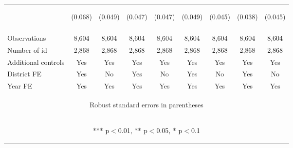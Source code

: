 \begin{center}
\begin{tabular}{lcccccccc}
 & \begin{footnotesize}(0.068)\end{footnotesize} & \begin{footnotesize}(0.049)\end{footnotesize} & \begin{footnotesize}(0.047)\end{footnotesize} & \begin{footnotesize}(0.047)\end{footnotesize} & \begin{footnotesize}(0.049)\end{footnotesize} & \begin{footnotesize}(0.045)\end{footnotesize} & \begin{footnotesize}(0.038)\end{footnotesize} & \begin{footnotesize}(0.045)\end{footnotesize} \\
\vspace{4pt} & \begin{footnotesize}\end{footnotesize} & \begin{footnotesize}\end{footnotesize} & \begin{footnotesize}\end{footnotesize} & \begin{footnotesize}\end{footnotesize} & \begin{footnotesize}\end{footnotesize} & \begin{footnotesize}\end{footnotesize} & \begin{footnotesize}\end{footnotesize} & \begin{footnotesize}\end{footnotesize} \\
Observations & 8,604 & 8,604 & 8,604 & 8,604 & 8,604 & 8,604 & 8,604 & 8,604 \\
Number of id & 2,868 & 2,868 & 2,868 & 2,868 & 2,868 & 2,868 & 2,868 & 2,868 \\
Additional controls & Yes & Yes & Yes & Yes & Yes & Yes & Yes & Yes \\
District FE & Yes & No & Yes & No & Yes & No & Yes & No \\
 Year FE & Yes & Yes & Yes & Yes & Yes & Yes & Yes & Yes \\ \hline
\multicolumn{9}{c}{\begin{footnotesize} Robust standard errors in parentheses\end{footnotesize}} \\
\multicolumn{9}{c}{\begin{footnotesize} *** p$<$0.01, ** p$<$0.05, * p$<$0.1\end{footnotesize}} \\
\end{tabular}
\end{center}
